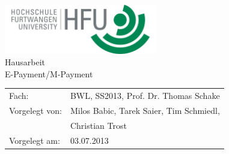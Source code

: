 \documentclass[pdftex,fontsize=11pt,a4paper]{scrbook}
\begin{document}
\begin{titlepage}
\thispagestyle{empty}
\begin{center}
\includegraphics[width=0.5\textwidth]{img/hfu.png}~\\[1.5cm]
\Huge Hausarbeit\\[0.3cm]
E-Payment/M-Payment\\[2cm]
\Large
\begin{tabular}{ll}
Fach: & BWL, SS2013, Prof. Dr. Thomas Schake\\
Vorgelegt von: & Milos Babic, Tarek Saier, Tim Schmiedl,\\
&Christian Trost\\
Vorgelegt am: & 03.07.2013
\end{tabular}
\end{center}
\end{titlepage}
\end{document}
